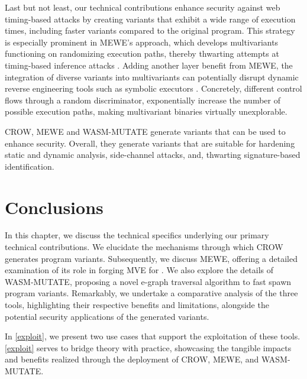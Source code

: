 Last but not least, our technical contributions enhance security against web timing-based attacks \cite{morgan2015web, DBLP:conf/ndss/SchnitzlerKBP23} by creating variants that exhibit a wide range of execution times, including faster variants compared to the original program. 
This strategy is especially prominent in MEWE’s approach, which develops multivariants functioning on randomizing execution paths, thereby thwarting attempts at timing-based inference attacks \cite{DBLP:conf/ndss/SchnitzlerKBP23}. 
Adding another layer benefit from MEWE, the integration of diverse variants into multivariants can potentially disrupt dynamic reverse engineering tools such as symbolic executors \cite{wasmixer}. 
Concretely, different control flows through a random discriminator, exponentially increase the number of possible execution paths, making multivariant binaries virtually unexplorable.


\begin{tcolorbox}[title=Takeaway,boxrule=1pt,arc=.2em,boxsep=1.0mm]
    CROW, MEWE and WASM-MUTATE generate \Wasm variants that can be used to enhance security. 
    Overall, they generate variants that are suitable for hardening static and dynamic analysis, side-channel attacks, and, thwarting signature-based identification. 
\end{tcolorbox}


\section*{Conclusions}

In this chapter, we discuss the technical specifics underlying our primary technical contributions.
We elucidate the mechanisms through which CROW generates program variants.
Subsequently, we discuss MEWE, offering a detailed examination of its role in forging MVE for \Wasm. 
We also explore the details of WASM-MUTATE, proposing a novel e-graph traversal algorithm to fast spawn \wasm program variants. 
Remarkably, we undertake a comparative analysis of the three tools, highlighting their respective benefits and limitations, alongside the potential security applications of the generated \wasm variants. 

In \autoref{exploit}, we present two use cases that support the exploitation of these tools.
\autoref{exploit} serves to bridge theory with practice, showcasing the tangible impacts and benefits realized through the deployment of CROW, MEWE, and WASM-MUTATE.

